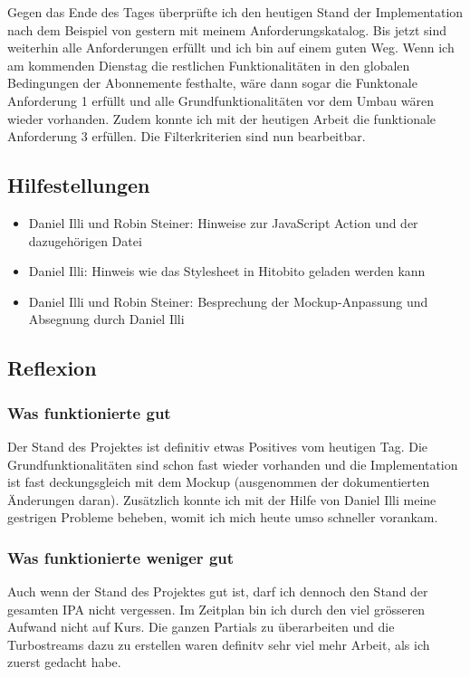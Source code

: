 Gegen das Ende des Tages überprüfte ich den heutigen Stand der Implementation nach dem Beispiel von gestern mit meinem Anforderungskatalog. Bis jetzt sind weiterhin
alle Anforderungen erfüllt und ich bin auf einem guten Weg. Wenn ich am kommenden Dienstag die restlichen Funktionalitäten in den globalen Bedingungen der Abonnemente
festhalte, wäre dann sogar die Funktonale Anforderung 1 erfüllt und alle Grundfunktionalitäten vor dem Umbau wären wieder vorhanden.  Zudem konnte ich mit der heutigen Arbeit 
die funktionale Anforderung 3 erfüllen. Die Filterkriterien sind nun bearbeitbar.

\subsection*{Hilfestellungen}
\begin{itemize}
    \item Daniel Illi und Robin Steiner: Hinweise zur JavaScript Action und der dazugehörigen Datei
    \item Daniel Illi: Hinweis wie das Stylesheet in Hitobito geladen werden kann
    \item Daniel Illi und Robin Steiner: Besprechung der Mockup-Anpassung und Absegnung durch Daniel Illi
\end{itemize}

\subsection*{Reflexion}

\subsubsection*{Was funktionierte gut}
Der Stand des Projektes ist definitiv etwas Positives vom heutigen Tag. Die Grundfunktionalitäten sind schon fast wieder vorhanden
und die Implementation ist fast deckungsgleich mit dem Mockup (ausgenommen der dokumentierten Änderungen daran). Zusätzlich konnte ich mit der Hilfe
von Daniel Illi meine gestrigen Probleme beheben, womit ich mich heute umso schneller vorankam.

\subsubsection*{Was funktionierte weniger gut}
Auch wenn der Stand des Projektes gut ist, darf ich dennoch den Stand der gesamten IPA nicht vergessen.
Im Zeitplan bin ich durch den viel grösseren Aufwand nicht auf Kurs. Die ganzen Partials zu überarbeiten und
die Turbostreams dazu zu erstellen waren definitv sehr viel mehr Arbeit, als ich zuerst gedacht habe.

